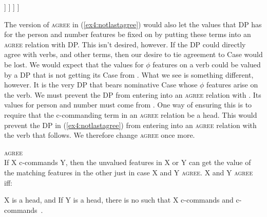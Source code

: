 \begin{exe}
\ex \label{ex4:ca3}
\small
\begin{forest}
[TP
	[\obar{T}\\ $\bullet$person: \emph{\nth{3}}\\ $\bullet$number: \emph{sing}\\ case: \emph{nom}\\ tense: \emph{pres} ]
	[VP
		[DP\\ case:\\ person: \emph{\nth{3}}\\ number: \emph{sing} ]
		[\ibar{V}
			[\obar{V}\\ person:\\number:\\tense: [run]]
		 ]
	 ]
]
\end{forest}
\end{exe}

The version of \textsc{agree} in (\ref{ex4:notlastagree}) would also let the values that DP has for the person and number features be fixed on  by putting these terms into an \textsc{agree} relation with DP. This isn't desired, however. If the DP could directly agree with verbs, and other terms, then our desire to tie agreement to Case would be lost. We would expect that the values for $\phi$ features on a verb could be valued by a DP that is not getting its Case from . What we see is something different, however. It is the very DP that bears nominative Case whose $\phi$ features arise on the verb. We must prevent the DP from entering into an \textsc{agree} relation with . Its values for person and number must come from . One way of ensuring this is to require that the c-commanding term in an \textsc{agree} relation be a head. This would prevent the DP in (\ref{ex4:notlastagree}) from entering into an \textsc{agree} relation with the verb that follows. We therefore change \textsc{agree} once more.
\pagebreak
\begin{exe}
\ex \label{ex4:nxt2lastagree} \textsc{agree}\\
If X c-commands Y, then the unvalued features in X or Y can get the value of the matching features in the other just in case X and Y \textsc{agree}. X and Y \textsc{agree} iff:
\begin{xlist}
	\ex X is a head, and
	\ex If Y is a head, there is no  such that X c-commands  and  c-commands~.
\end{xlist}
\end{exe}

